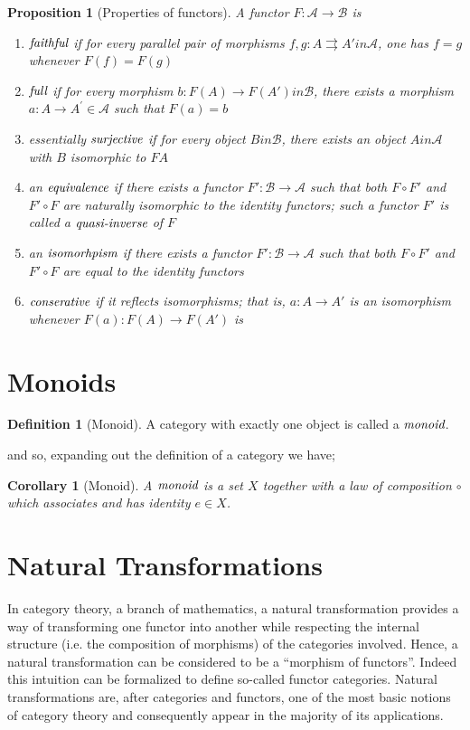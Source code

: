 \documentclass[10pt, oneside, reqno]{amsart}
\theoremstyle{plain}%
\newtheorem{prop}[thm]{Proposition}
\newtheorem*{cor}{Corollary}
\theoremstyle{definition}
\newtheorem{defn}[thm]{Definition}
\theoremstyle{remark}
\begin{document}
\begin{prop}[Properties of functors]
A functor $F : \mathcal{A} \to \mathcal{B}$ is
\begin{enumerate}
	\item $\emph{faithful}$ if for every parallel pair of morphisms $f,g : A \rightrightarrows A' in \mathcal{A}$, one has $f = g$ whenever $F(f) = F(g)$
	\item $\emph{full}$ if for every morphism $b: F(A) \to F(A') in \mathcal{B}$, there exists a morphism $a: A \to A^{'} \in \mathcal{A}$ such that $F(a) = b$
	\item essentially $\emph{surjective}$ if for every object $B in \mathcal{B}$, there exists an object $A in \mathcal{A}$ with $B$ isomorphic to $F A$
	\item an $\emph{equivalence}$ if there exists a functor $F' : \mathcal{B} \to \mathcal{A}$ such that both $F \circ F'$ and $F' \circ F$ are naturally
		isomorphic to the identity functors; such a functor $F'$ is called a $\emph{quasi-inverse}$ of $F$
	\item an $\emph{isomorhpism}$ if there exists a functor $F' : \mathcal{B} \to \mathcal{A}$ such that both $F \circ F'$ and $F' \circ F$ are equal to the identity functors
	\item $\emph{conserative}$ if it reflects isomorphisms; that is, $a: A \to A'$ is an isomorphism whenever $F(a): F(A) \to F(A')$ is
\end{enumerate}
\end{prop}

\section{Monoids} %
\label{sec:monoids}

\begin{defn}[Monoid]
A category with exactly one object is called a $\emph{monoid}$.
\end{defn}

and so, expanding out the definition of a category we have;
\begin{cor}[Monoid]
A $\emph{monoid}$ is a set $X$ together with a law of composition $\circ$
which associates and has identity $e \in X$.
\end{cor}

\section{Natural Transformations} %
\label{sec:natural transformations}
In category theory, a branch of mathematics, a natural transformation provides a way of transforming one functor into another
while respecting the internal structure (i.e. the composition of morphisms) of the categories involved.
Hence, a natural transformation can be considered to be a ``morphism of functors''.
Indeed this intuition can be formalized to define so-called functor categories.
Natural transformations are, after categories and functors, one of the most basic notions of category theory and consequently
appear in the majority of its applications.
\end{document}
